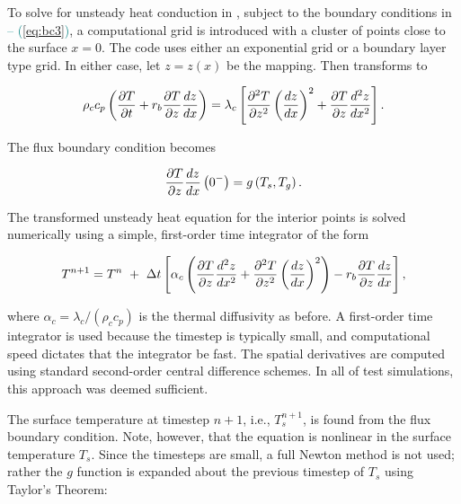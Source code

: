 \setcounter{figure}{0}
\setcounter{table}{0}
\setcounter{equation}{0}


To solve for unsteady heat conduction in , subject to the boundary conditions in  \textcolor{teal}{-- (\ref{eq:bc3})}, a computational grid is introduced with a cluster of points close to the surface $x=0$. The code uses either an exponential grid or a boundary layer type grid. In either case, let $z=z(x)$ be the mapping. Then  transforms to

\begin{equation}
\rho_c c_p \left( {\partial T\over\partial t} + r_b {\partial T \over \partial z} {dz \over dx} \right) 
= \lambda_c \left[ {\partial^2 T \over \partial z^2} \left({dz \over dx}\right)^2
+ {\partial T \over \partial z} {d^2 z \over dx^2} \right].
\end{equation}

The flux boundary condition becomes

\begin{equation}
{\partial T \over \partial z}{dz \over dx}\left(0^-\right) = g\left(T_s,T_g\right).
\end{equation}

The transformed unsteady heat equation for the interior points is solved numerically using a simple, first-order time integrator of the form

\begin{equation}
T^{n+1}=T^n~+~\Delta t\left[ 
\alpha_c \left( {\partial T \over \partial z} {d^2z \over dx^2}
+ {\partial^2 T \over \partial z^2} \left({dz \over dx}\right)^2 \right)
- r_b {\partial T \over \partial z} {dz \over dx} \right],
\label{eq:fotimeint}
\end{equation}

where $\alpha_c=\lambda_c/(\rho_c c_p)$ is the thermal diffusivity as before. A first-order time integrator is used because the timestep is typically small, and computational speed dictates that the integrator be fast. The spatial derivatives are computed using standard second-order central difference schemes. In all of test simulations, this approach was deemed sufficient.

The surface temperature at timestep $n+1$, i.e., $T_s^{n+1}$, is found from the flux boundary condition.
Note, however, that the equation is nonlinear in the surface temperature $T_s$. Since the timesteps are small, a full Newton method is not used; rather the $g$ function is expanded about the previous timestep of $T_s$ using Taylor's Theorem:

